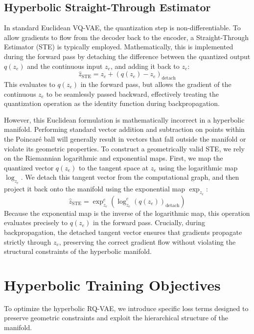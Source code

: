 \documentclass[12pt]{report}
\begin{document}
\subsection{Hyperbolic Straight-Through Estimator}
In standard Euclidean VQ-VAE, the quantization step is non-differentiable. To allow gradients to flow from the decoder back to the encoder, a Straight-Through Estimator (STE) is typically employed. Mathematically, this is implemented during the forward pass by detaching the difference between the quantized output $q(z_e)$ and the continuous input $z_e$, and adding it back to $z_e$:
\begin{equation}
    \hat{z}_{\text{STE}} = z_e + (q(z_e) - z_e)_{\text{detach}}
\end{equation}
This evaluates to $q(z_e)$ in the forward pass, but allows the gradient of the continuous $z_e$ to be seamlessly passed backward, effectively treating the quantization operation as the identity function during backpropagation.

However, this Euclidean formulation is mathematically incorrect in a hyperbolic manifold. Performing standard vector addition and subtraction on points within the Poincar\'e ball will generally result in vectors that fall outside the manifold or violate its geometric properties. To construct a geometrically valid STE, we rely on the Riemannian logarithmic and exponential maps. First, we map the quantized vector $q(z_e)$ to the tangent space at $z_e$ using the logarithmic map $\log_{z_e}$. We detach this tangent vector from the computational graph, and then project it back onto the manifold using the exponential map $\exp_{z_e}$:
\begin{equation}
    \hat{z}_{\text{STE}} = \exp_{z_e}^c \left( \log_{z_e}^c(q(z_e))_{\text{detach}} \right)
\end{equation}
Because the exponential map is the inverse of the logarithmic map, this operation evaluates precisely to $q(z_e)$ in the forward pass. Crucially, during backpropagation, the detached tangent vector ensures that gradients propagate strictly through $z_e$, preserving the correct gradient flow without violating the structural constraints of the hyperbolic manifold.

\section{Hyperbolic Training Objectives}
To optimize the hyperbolic RQ-VAE, we introduce specific loss terms designed to preserve geometric constraints and exploit the hierarchical structure of the manifold.
\end{document}
